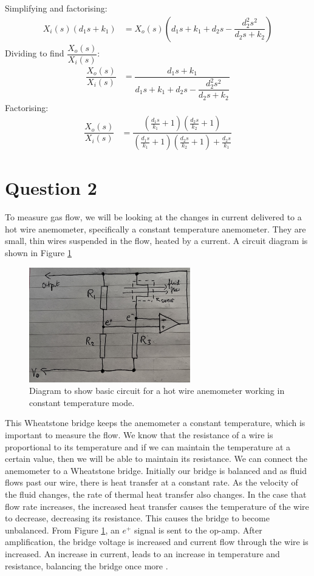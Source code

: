 \documentclass[11pt]{article}
\numberwithin{equation}{section}
\begin{document}
Simplifying and factorising:
\begin{align}
    X_i(s)\left(d_1 s + k_1\right) &= X_o(s) \left(d_1 s + k_1 + d_2 s - \dfrac{d_2^2 s^2}{d_2s + k_2}\right)
\end{align}
Dividing to find $\dfrac{X_o(s)}{X_i(s)}$:
\begin{align}
    \dfrac{X_o(s)}{X_i(s)} &= \dfrac{d_1 s + k_1}{d_1 s + k_1 + d_2 s - \dfrac{d_2^2 s^2}{d_2s + k_2}}
\end{align}
Factorising:
\begin{align}
    \dfrac{X_o(s)}{X_i(s)} &= \dfrac{\left(\frac{d_1s}{k_1} + 1\right)\left(\frac{d_2s}{k_2} + 1\right)}{\left(\frac{d_1s}{k_1} + 1\right)\left(\frac{d_2 s}{k_2}+1\right) + \frac{d_2s}{k_1}}
\end{align}
\section{Question 2}
To measure gas flow, we will be looking at the changes in current delivered to a hot wire anemometer, specifically a constant temperature anemometer. They are small, thin wires suspended in the flow, heated by a current. A circuit diagram is shown in Figure \ref{fig:q2i1}
\begin{figure}[H]
    \centering
    \includegraphics[height = 5cm]{./img/q2i1.jpg}
    \caption{Diagram to show basic circuit for a hot wire anemometer working in constant temperature mode.} 
    \label{fig:q2i1}
 \end{figure}
This Wheatstone bridge keeps the anemometer a constant temperature, which is important to measure the flow. We know that the resistance of a wire is proportional to its temperature and if we can maintain the temperature at a certain value, then we will be able to maintain its resistance. We can connect the anemometer to a Wheatstone bridge. Initially our bridge is balanced and as fluid flows past our wire, there is heat transfer at a constant rate. As the velocity of the fluid changes, the rate of thermal heat transfer also changes. In the case that flow rate increases, the increased heat transfer causes the temperature of the wire to decrease, decreasing its resistance. This causes the bridge to become unbalanced. From Figure \ref{fig:q2i1}, an $e^+$ signal is sent to the op-amp. After amplification, the bridge voltage is increased and current flow through the wire is increased. An increase in current, leads to an increase in temperature and resistance, balancing the bridge once more \cite{b1}.
\end{document}
